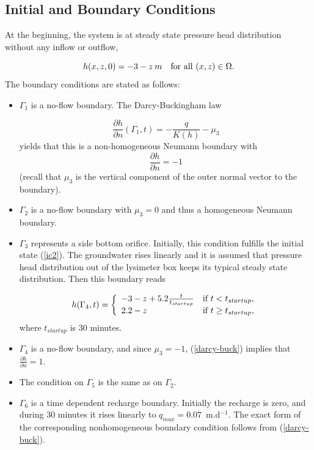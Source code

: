 \documentclass[final,3p,times,twocolumn]{elsarticle}
\begin{document}
\subsection{Initial and Boundary Conditions}

At the beginning, the system is at steady state pressure head distribution 
without any inflow or outflow,

\begin{equation}\label{ic2}
h(x,z,0) = -3 - z \hspace{0.75mm}m \  \ \ \mbox{for all } (x, z) \in \Omega.
\end{equation}
The boundary conditions are stated as follows:

\begin{itemize}
\item $\Gamma_1$ is a no-flow boundary. The Darcy-Buckingham law

\begin{equation}
\label{darcy-buck}
\frac{\partial h}{\partial n}(\Gamma_1,t) = -\frac{q }{K(h)} - \mu_3
\end{equation}
yields that this is a non-homogeneous Neumann boundary with 
$$\frac{\partial h}{\partial n} = -1$$ (recall that $\mu_3$ is
the vertical component of the outer normal vector to the boundary).
\item $\Gamma_2$ is a no-flow boundary with $\mu_3 = 0$ and
thus a homogeneous Neumann boundary.
\item $\Gamma_3$ represents a side bottom orifice. 
Initially, this condition fulfills the initial state (\ref{ic2}). 
The groundwater rises linearly and it is assumed that pressure head 
distribution out of the lysimeter box keeps its typical steady state 
distribution. Then this boundary reads

\begin{equation}
\label{gamma3}
h(\Gamma_4,t) = \left\{
    \begin{array}{l l}
    -3 -z + 5.2\frac{t}{t_{startup}} 
    &\mbox{if $ t < t_{startup}$}, \\
     2.2 - z &\mbox{if $ t \geq t_{startup}$}, \\
    \end{array} \right.
\end{equation}
where $t_{startup}$ is 30 minutes.
\item $\Gamma_4$ is a no-flow boundary, and since $\mu_3 = -1$,
(\ref{darcy-buck}) implies that  $\frac{\partial h}{\partial n} = 1$.
\item The condition on $\Gamma_5$ is the same as on $\Gamma_2$.
\item $\Gamma_6$ is a time dependent recharge boundary. Initially the recharge 
is zero, and during 30 minutes it rises linearly to  
$q_{max}= 0.07$~m.d${}^{-1}$. The exact form of the corresponding 
nonhomogeneous boundary condition follows from (\ref{darcy-buck}).
\end{itemize}
\end{document}

